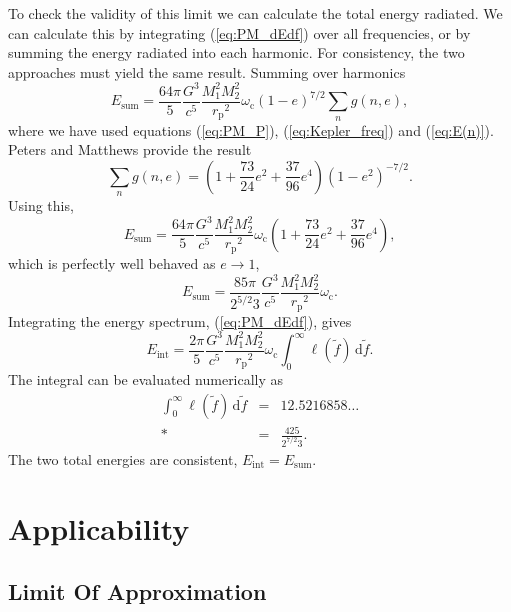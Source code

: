 \documentclass[aps,prd,reprint,showpacs,groupedaddress]{revtex4-1}
\newcommand{\eqnref}[1]{(\ref{eq:#1})}
\newcommand{\sub}[1]{\ensuremath{_\text{#1}}}
\newcommand{\dd}{\ensuremath{\mathrm{d}}}
\newcommand{\intd}[4]{\ensuremath{\int_{#1}^{#2}{#3}\,\dd{#4}}}
\begin{document}
To check the validity of this limit we can calculate the total energy radiated. We can calculate this by integrating \eqnref{PM_dEdf} over all frequencies, or by summing the energy radiated into each harmonic. For consistency, the two approaches must yield the same result. Summing over harmonics
\begin{equation}
E\sub{sum} = \frac{64\pi}{5}\frac{G^3}{c^5}\frac{M_1^2M_2^2}{r\sub{p}^2}\omega\sub{c}(1-e)^{7/2}\sum_n g(n,e),
\end{equation}
where we have used equations \eqnref{PM_P}, \eqnref{Kepler_freq} and \eqnref{E(n)}. Peters and Matthews\cite{Peters1963} provide the result
\begin{equation}
\sum_n g(n,e) = \left(1 + \frac{73}{24}e^2 + \frac{37}{96}e^4\right)(1-e^2)^{-7/2}.
\end{equation}
Using this,
\begin{equation}
E\sub{sum} = \frac{64\pi}{5}\frac{G^3}{c^5}\frac{M_1^2M_2^2}{r\sub{p}^2}\omega\sub{c}\left(1 + \frac{73}{24}e^2 + \frac{37}{96}e^4\right),
\end{equation}
which is perfectly well behaved as $e \rightarrow 1$,
\begin{equation}
E\sub{sum} = \frac{85\pi}{2^{5/2}3}\frac{G^3}{c^5}\frac{M_1^2M_2^2}{r\sub{p}^2}\omega\sub{c}.
\label{eq:PM_total}
\end{equation}
Integrating the energy spectrum, \eqnref{PM_dEdf}, gives
\begin{equation}
E\sub{int} = \frac{2\pi}{5}\frac{G^3}{c^5}\frac{M_1^2M_2^2}{r\sub{p}^2}\omega\sub{c}\intd{0}{\infty}{\ell(\tilde{f})}{\tilde{f}}.
\end{equation}
The integral can be evaluated numerically as
\begin{eqnarray}
\intd{0}{\infty}{\ell(\tilde{f})}{\tilde{f}} & = & 12.5216858\ldots \nonumber \\*
 & = & \frac{425}{2^{7/2}3}.
\end{eqnarray}
The two total energies are consistent, $E\sub{int} = E\sub{sum}$.

\section{Applicability\label{sec:application}}

\subsection{Limit Of Approximation}
\end{document}
